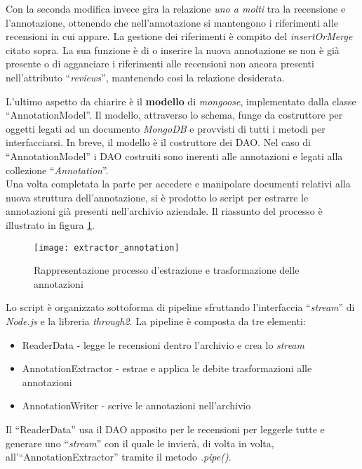 Con la seconda modifica invece gira la relazione \textit{uno a molti} tra
la recensione e l'annotazione, ottenendo che nell'annotazione si mantengono i
riferimenti alle recensioni in cui appare. La gestione dei riferimenti è
compito del \textit{insertOrMerge} citato sopra. La sua funzione è di o inserire
la nuova annotazione se non è già presente o di agganciare i riferimenti alle
recensioni non ancora presenti nell'attributo ``\textit{reviews}'', mantenendo
cosi la relazione desiderata.

L'ultimo aspetto da chiarire è il \textbf{modello} di \textit{mongoose},
implementato dalla classe ``AnnotationModel''. Il modello, attraverso lo schema,
funge da costruttore per oggetti legati ad un documento \textit{MongoDB} e
provvisti di tutti i metodi per interfacciarsi. In breve, il modello è il
costruttore dei \gls{DAO}. Nel caso di ``AnnotationModel'' i \gls{DAO}
costruiti sono inerenti alle annotazioni e legati alla collezione
``\textit{Annotation}''. \\

Una volta completata la parte per accedere e manipolare documenti relativi
alla nuova struttura dell'annotazione, si è prodotto lo \gls{script} per
estrarre le annotazioni già presenti nell'archivio aziendale. Il riassunto del
processo è illustrato in figura \ref{fig:extractor_annotation}.

\begin{figure}[H]
\begin{center}
\texttt{[image: extractor\_annotation]}
\caption{
Rappresentazione processo d'estrazione e trasformazione delle annotazioni
}
\label{fig:extractor_annotation}
\end{center}
\end{figure}

Lo script è organizzato sottoforma di \gls{pipeline} sfruttando l'interfaccia
``\textit{stream}'' di \textit{Node.js} e la libreria \textit{through2}. La
\gls{pipeline} è composta da tre elementi:
\begin{itemize}
\item ReaderData - legge le recensioni dentro l'archivio e crea lo
\textit{stream}
\item AnnotationExtractor - estrae e applica le debite trasformazioni alle
annotazioni
\item AnnotationWriter - scrive le annotazioni nell'archivio
\end{itemize}

Il ``ReaderData'' usa il \gls{DAO} apposito per le recensioni per leggerle tutte
e generare uno ``\textit{stream}'' con il quale le invierà, di volta in volta,
all'``AnnotationExtractor'' tramite il metodo \textit{.pipe()}.


